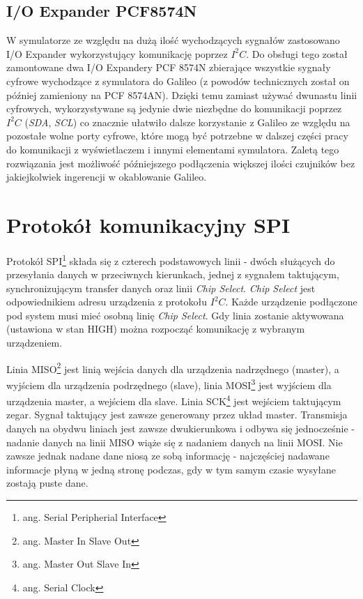 \documentclass{xmgr}
\begin{document}
\subsection{I/O Expander PCF8574N}
W symulatorze ze względu na dużą ilość wychodzących sygnałów zastosowano I/O Expander wykorzystujący komunikację poprzez $I^2C$. Do obsługi tego został zamontowane dwa I/O Expandery PCF 8574N zbierające wszystkie sygnały cyfrowe wychodzące z symulatora do Galileo (z powodów technicznych został on później zamieniony na PCF 8574AN). Dzięki temu zamiast używać dwunastu linii cyfrowych, wykorzystywane są jedynie dwie niezbędne do komunikacji poprzez $I^2C$ (\emph{SDA}, \emph{SCL}) co znacznie ułatwiło dalsze korzystanie z Galileo ze względu na pozostałe wolne porty cyfrowe, które mogą być potrzebne w dalszej części pracy do komunikacji z wyświetlaczem i innymi elementami symulatora. Zaletą tego rozwiązania jest możliwość późniejszego podłączenia większej ilości czujników bez jakiejkolwiek ingerencji w okablowanie Galileo.

\section{Protokół komunikacyjny SPI}
Protokół SPI\footnote{ang. Serial Peripherial Interface} składa się z czterech podstawowych linii - dwóch służących do przesyłania danych w przeciwnych kierunkach, jednej z sygnałem taktującym, synchronizującym transfer danych oraz linii \emph{Chip Select}. \emph{Chip Select} jest odpowiednikiem adresu urządzenia z protokołu $I^2C$. Każde urządzenie podłączone pod system musi mieć osobną linię \emph{Chip Select}. Gdy linia zostanie aktywowana (ustawiona w stan HIGH) można rozpocząć komunikację z wybranym urządzeniem.

Linia MISO\footnote{ang. Master In Slave Out} jest linią wejścia danych dla urządzenia nadrzędnego (master), a wyjściem dla urządzenia podrzędnego (slave), linia MOSI\footnote{ang. Master Out Slave In} jest wyjściem dla urządzenia master, a wejściem dla slave. Linia SCK\footnote{ang. Serial Clock} jest wejściem taktującym zegar. Sygnał taktujący jest zawsze generowany przez układ master. Transmisja danych na obydwu liniach jest zawsze dwukierunkowa i odbywa się jednocześnie - nadanie danych na linii MISO wiąże się z nadaniem danych na linii MOSI. Nie zawsze jednak nadane dane niosą ze sobą informację - najczęściej nadawane informacje płyną w jedną stronę podczas, gdy w tym samym czasie wysyłane zostają puste dane.\cite{Dorra}
\end{document}
